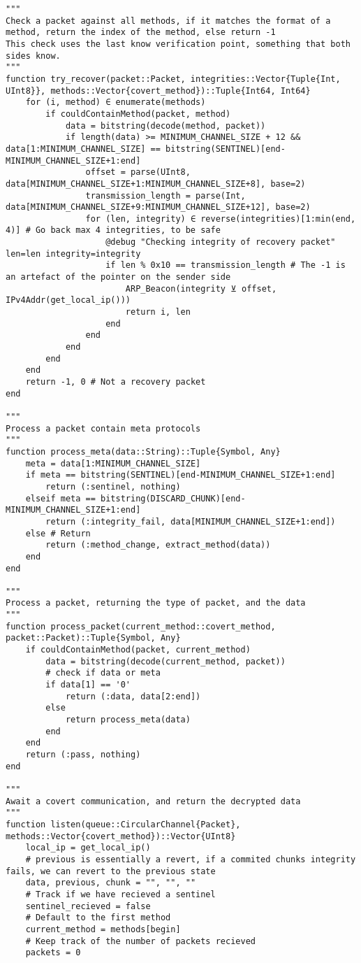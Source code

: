 \begin{lstlisting}[language=JuliaLocal, style=julia]
"""
Check a packet against all methods, if it matches the format of a method, return the index of the method, else return -1
This check uses the last know verification point, something that both sides know.
"""
function try_recover(packet::Packet, integrities::Vector{Tuple{Int, UInt8}}, methods::Vector{covert_method})::Tuple{Int64, Int64}
    for (i, method) ∈ enumerate(methods)
        if couldContainMethod(packet, method)
            data = bitstring(decode(method, packet))
            if length(data) >= MINIMUM_CHANNEL_SIZE + 12 && data[1:MINIMUM_CHANNEL_SIZE] == bitstring(SENTINEL)[end-MINIMUM_CHANNEL_SIZE+1:end]
                offset = parse(UInt8, data[MINIMUM_CHANNEL_SIZE+1:MINIMUM_CHANNEL_SIZE+8], base=2)
                transmission_length = parse(Int, data[MINIMUM_CHANNEL_SIZE+9:MINIMUM_CHANNEL_SIZE+12], base=2)
                for (len, integrity) ∈ reverse(integrities)[1:min(end, 4)] # Go back max 4 integrities, to be safe
                    @debug "Checking integrity of recovery packet" len=len integrity=integrity
                    if len % 0x10 == transmission_length # The -1 is an artefact of the pointer on the sender side
                        ARP_Beacon(integrity ⊻ offset, IPv4Addr(get_local_ip()))
                        return i, len
                    end
                end
            end
        end
    end
    return -1, 0 # Not a recovery packet
end

"""
Process a packet contain meta protocols
"""
function process_meta(data::String)::Tuple{Symbol, Any}
    meta = data[1:MINIMUM_CHANNEL_SIZE]
    if meta == bitstring(SENTINEL)[end-MINIMUM_CHANNEL_SIZE+1:end]
        return (:sentinel, nothing)
    elseif meta == bitstring(DISCARD_CHUNK)[end-MINIMUM_CHANNEL_SIZE+1:end]
        return (:integrity_fail, data[MINIMUM_CHANNEL_SIZE+1:end])
    else # Return 
        return (:method_change, extract_method(data))
    end
end
    
"""
Process a packet, returning the type of packet, and the data
"""
function process_packet(current_method::covert_method, packet::Packet)::Tuple{Symbol, Any}
    if couldContainMethod(packet, current_method)
        data = bitstring(decode(current_method, packet))
        # check if data or meta
        if data[1] == '0'
            return (:data, data[2:end])
        else
            return process_meta(data)
        end
    end
    return (:pass, nothing)
end

"""
Await a covert communication, and return the decrypted data
"""
function listen(queue::CircularChannel{Packet}, methods::Vector{covert_method})::Vector{UInt8}
    local_ip = get_local_ip()
    # previous is essentially a revert, if a commited chunks integrity fails, we can revert to the previous state
    data, previous, chunk = "", "", ""
    # Track if we have recieved a sentinel
    sentinel_recieved = false
    # Default to the first method
    current_method = methods[begin]
    # Keep track of the number of packets recieved
    packets = 0


\end{lstlisting}
